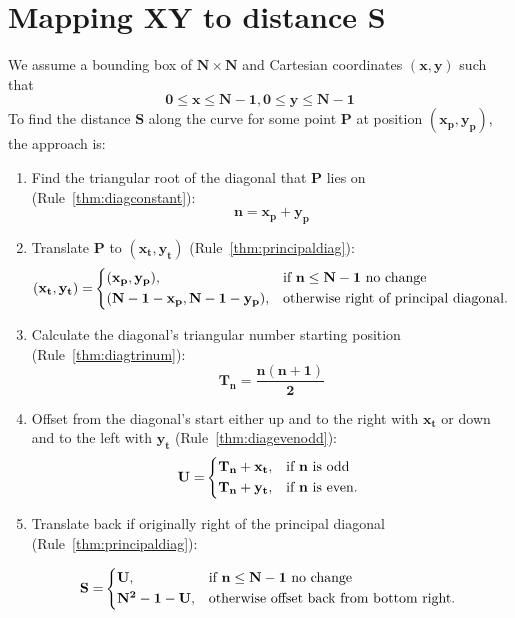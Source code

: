 \documentclass[10pt]{article}
\theoremstyle{theorem}
\begin{document}

\section{Mapping XY to distance S}

We assume a bounding box of $\mathbf{N \times N}$ and Cartesian coordinates
$\mathbf{(x, y)}$ such that
\[
  \mathbf{0 \leq x \leq N-1, 0 \leq y \leq N-1}
\]
To find the distance $\mathbf{S}$ along the curve for some point $\mathbf{P}$
at position $\mathbf{(x_p,y_p)}$, the approach is:
\begin{enumerate}
  \item Find the triangular root of the diagonal that $\mathbf{P}$ lies on
    (Rule~\ref{thm:diagconstant}):
    \[\mathbf{n=x_p+y_p}\]
  \item Translate $\mathbf{P}$ to $\mathbf{(x_t,y_t)}$
    (Rule~\ref{thm:principaldiag}):
    \begin{align}
      \mathbf{(x_t,y_t) =}
      \begin{cases*}
        \mathbf{(x_p, y_p)}, & if $\mathbf{n \leq N-1}$ no change \\
        \mathbf{(N-1-x_p, N-1-y_p)}, & otherwise right of principal diagonal. \\
      \end{cases*} \notag
    \end{align}
  \item Calculate the diagonal's triangular number starting position
    (Rule~\ref{thm:diagtrinum}):
    \begin{equation}\label{eqn:triangular}
      \mathbf{T_n=\frac{n(n+1)}{2}}
    \end{equation}
  \item Offset from the diagonal's start either up and to the right with $\mathbf{x_t}$
    or down and to the left with $\mathbf{y_t}$ (Rule~\ref{thm:diagevenodd}):
    \begin{align}
      \mathbf{U =}
      \begin{cases*}
        \mathbf{T_n + x_t}, & if $\mathbf{n}$ is odd \\
        \mathbf{T_n + y_t}, & if $\mathbf{n}$ is even. \\
      \end{cases*} \notag
    \end{align}
  \item Translate back if originally right of the principal diagonal
    (Rule~\ref{thm:principaldiag}):

    \begin{align}
      \mathbf{S =}
      \begin{cases*}
        \mathbf{U}, & if $\mathbf{n \leq N-1}$ no change \\
        \mathbf{N^2-1-U}, & otherwise offset back from bottom right. \\
      \end{cases*} \notag
    \end{align}

\end{enumerate}
\end{document}
